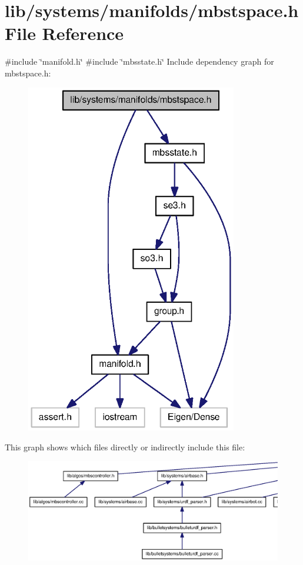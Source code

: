 \section{lib/systems/manifolds/mbstspace.h \-File \-Reference}
\label{mbstspace_8h}
{\ttfamily \#include \char`\"{}manifold.\-h\char`\"{}}\*
{\ttfamily \#include \char`\"{}mbsstate.\-h\char`\"{}}\*
\-Include dependency graph for mbstspace.\-h\-:
\nopagebreak
\begin{figure}[H]
\begin{center}
\leavevmode
\includegraphics[width=262pt]{mbstspace_8h__incl}
\end{center}
\end{figure}
\-This graph shows which files directly or indirectly include this file\-:
\nopagebreak
\begin{figure}[H]
\begin{center}
\leavevmode
\includegraphics[width=350pt]{mbstspace_8h__dep__incl}
\end{center}
\end{figure}
